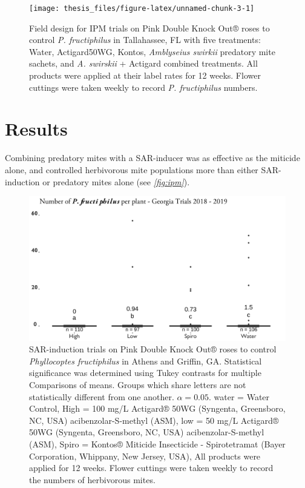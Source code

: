 \documentclass[12pt,final,CPage]{ufthesis}
\begin{document}
{\begin{figure}
  {\centering \texttt{[image: thesis\_files/figure-latex/unnamed-chunk-3-1]} 

  }

  \caption[Field design for IPM trials on Pink Double Knock Out® roses to control \textit{P. fructiphilus} in Tallahassee, FL with five treatments]{Field design for IPM trials on Pink Double Knock Out® roses to control \textit{P. fructiphilus} in Tallahassee, FL with five treatments: Water, Actigard50WG, Kontos, \textit{Amblyseius swirkii} predatory mite sachets, and \textit{A. swirskii} + Actigard combined treatments. All products were applied at their label rates for 12 weeks. Flower cuttings were taken weekly to record \textit{P. fructiphilus} numbers.}\label{fig:unnamed-chunk-3}
  \end{figure}
  \hypertarget{results-asm-ipm}{%
  \section{Results}\label{results-asm-ipm}}

  Combining predatory mites with a SAR-inducer was as effective as the miticide alone, and controlled herbivorous mite populations more than either SAR-induction or predatory mites alone (see \emph{\ref{fig:ipm}}).
  \begin{figure}

  {\centering \includegraphics[width=0.8\linewidth]{figure/rrv_actigard_graph} 

  }

  \caption[SAR-induction trials on Pink Double Knock Out® roses to control \textit{Phyllocoptes fructiphilus} in Athens and Griffin, GA]{SAR-induction trials on Pink Double Knock Out® roses to control \textit{Phyllocoptes fructiphilus} in Athens and Griffin, GA. Statistical significance was determined using Tukey contrasts for multiple Comparisons of means. Groups which share letters are not statistically different from one another. $\alpha = 0.05$. water = Water Control, High = 100 \si{\milli\gram}/\si{\liter} Actigard® 50WG (Syngenta, Greensboro, NC, USA) acibenzolar-S-methyl (ASM), low = 50 \si{\milli\gram}/\si{\liter} Actigard® 50WG (Syngenta, Greensboro, NC, USA) acibenzolar-S-methyl (ASM), Spiro = Kontos® Miticide Insecticide - Spirotetramat (Bayer Corporation, Whippany, New Jersey, USA), All products were applied for 12 weeks. Flower cuttings were taken weekly to record the numbers of herbivorous mites.}\label{fig:asm-graph}
  \end{figure}
  \begin{landscape}\begin{table}


\end{table}
\end{landscape}}
\end{document}
